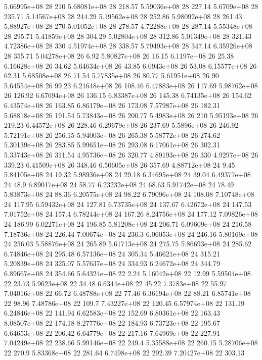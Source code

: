 5.66995e+08 28 210
5.68081e+08 28 218.57
5.59036e+08 28 227.14
5.6709e+08 28 235.71
5.14567e+08 28 244.29
5.19562e+08 28 252.86
5.98092e+08 28 261.43
5.88927e+08 28 270
5.01052e+08 28 278.57
4.72288e+08 28 287.14
5.55348e+08 28 295.71
5.41859e+08 28 304.29
5.02804e+08 28 312.86
5.01349e+08 28 321.43
4.72386e+08 28 330
4.51974e+08 28 338.57
5.79493e+08 28 347.14
6.35926e+08 28 355.71
5.04278e+08 26 6.92
5.80827e+08 26 16.15
6.1197e+08 26 25.38
6.16628e+08 26 34.62
5.64634e+08 26 43.85
6.0943e+08 26 53.08
6.15577e+08 26 62.31
5.68508e+08 26 71.54
5.77835e+08 26 80.77
5.61951e+08 26 90
5.64554e+08 26 99.23
6.21648e+08 26 108.46
6.47883e+08 26 117.69
5.98762e+08 26 126.92
6.67694e+08 26 136.15
6.83387e+08 26 145.38
6.74135e+08 26 154.62
6.43574e+08 26 163.85
6.86179e+08 26 173.08
7.57987e+08 26 182.31
5.68818e+08 26 191.54
5.73843e+08 26 200.77
5.4983e+08 26 210
5.95193e+08 26 219.23
6.44572e+08 26 228.46
6.29679e+08 26 237.69
5.5896e+08 26 246.92
5.72191e+08 26 256.15
5.94003e+08 26 265.38
5.58772e+08 26 274.62
5.30139e+08 26 283.85
5.99651e+08 26 293.08
6.17061e+08 26 302.31
5.33743e+08 26 311.54
4.95736e+08 26 320.77
4.89193e+08 26 330
4.9297e+08 26 339.23
6.41509e+08 26 348.46
6.50605e+08 26 357.69
4.88712e+08 24 9.45
5.84105e+08 24 19.32
5.98936e+08 24 29.18
6.34695e+08 24 39.04
6.49377e+08 24 48.9
6.89017e+08 24 58.77
6.23232e+08 24 68.63
5.91742e+08 24 78.49
5.83873e+08 24 88.36
6.20575e+08 24 98.22
6.79096e+08 24 108.08
7.10748e+08 24 117.95
6.59432e+08 24 127.81
6.73735e+08 24 137.67
6.42672e+08 24 147.53
7.01752e+08 24 157.4
6.78244e+08 24 167.26
8.24756e+08 24 177.12
7.09826e+08 24 186.99
6.02271e+08 24 196.85
5.81208e+08 24 206.71
6.09609e+08 24 216.58
7.18736e+08 24 226.44
7.00674e+08 24 236.3
6.06053e+08 24 246.16
5.80169e+08 24 256.03
5.58876e+08 24 265.89
5.61713e+08 24 275.75
5.86693e+08 24 285.62
6.74846e+08 24 295.48
6.57136e+08 24 305.34
5.46621e+08 24 315.21
5.20839e+08 24 325.07
5.57637e+08 24 334.93
6.24672e+08 24 344.79
6.89667e+08 24 354.66
5.64324e+08 22 2.24
5.16042e+08 22 12.99
5.59504e+08 22 23.73
5.9623e+08 22 34.48
6.6344e+08 22 45.22
7.3783e+08 22 55.97
7.04016e+08 22 66.72
6.48788e+08 22 77.46
6.36194e+08 22 88.21
6.85741e+08 22 98.96
7.48786e+08 22 109.7
7.43227e+08 22 120.45
6.57974e+08 22 131.19
6.24846e+08 22 141.94
6.62583e+08 22 152.69
6.80361e+08 22 163.43
8.08507e+08 22 174.18
8.27776e+08 22 184.93
6.73723e+08 22 195.67
6.64653e+08 22 206.42
6.64779e+08 22 217.16
7.64969e+08 22 227.91
7.04249e+08 22 238.66
5.99146e+08 22 249.4
5.35588e+08 22 260.15
5.28706e+08 22 270.9
5.83368e+08 22 281.64
6.7498e+08 22 292.39
7.20427e+08 22 303.13
